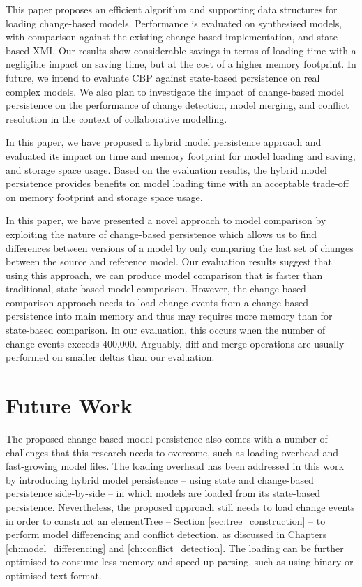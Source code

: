 This paper proposes an efficient algorithm and supporting data structures for loading change-based models.  Performance is evaluated on synthesised models, with comparison against the existing change-based implementation, and state-based XMI. Our results show considerable savings in terms of loading time with a negligible impact on saving time, but at the cost of a higher memory footprint.  In future, we intend to evaluate CBP against state-based persistence on real complex models.  We also plan to investigate the impact of change-based model persistence on the performance of change detection, model merging, and conflict resolution in the context of collaborative modelling. 

In this paper, we have proposed a hybrid model persistence approach and evaluated its impact on time and memory footprint for model loading and saving, and storage space usage.
Based on the evaluation results, the hybrid model persistence provides benefits on model loading time 
with an acceptable trade-off on memory footprint and storage space usage. 

In this paper, we have presented a novel approach to model comparison by exploiting the nature of change-based persistence which allows us to find differences between versions of a model by only comparing the last set of changes between the source and reference model.
Our evaluation results suggest that using this approach, we can produce model comparison that is faster than traditional, state-based model comparison.
However, the change-based comparison approach needs to load change events from a change-based persistence into main memory and thus may requires more memory than for state-based comparison. In our evaluation, this occurs when the number of change events exceeds 400,000.
Arguably, diff and merge operations are usually performed on smaller deltas than our evaluation.

\section{Future Work}
\label{future_work}
The proposed change-based model persistence also comes with a number of challenges that this research needs to overcome, such as loading overhead and fast-growing model files. The loading overhead has been addressed in this work by introducing hybrid model persistence -- using state and change-based persistence side-by-side -- in which models are loaded from its state-based persistence. Nevertheless, the proposed approach still needs to load change events in order to construct an \textsf{elementTree} -- Section \ref{sec:tree_construction} -- to perform model differencing and conflict detection, as discussed in Chapters \ref{ch:model_differencing} and \ref{ch:conflict_detection}. The loading can be further optimised to consume less memory and speed up parsing, such as using binary or optimised-text format.

